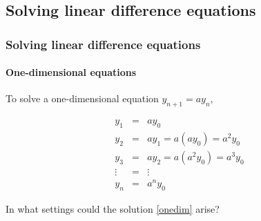 \documentclass[10pt, handout]{beamer}
\begin{document}
\subsection{Solving linear difference equations}
\begin{frame}
\frametitle{Solving linear difference equations}
\framesubtitle{One-dimensional equations}
To solve a one-dimensional equation $y_{n+1} = {a}y_{n}$,

\begin{eqnarray} \nonumber
y_1 &=& {a}y_0 \\ 
\nonumber
y_2 &=& {a}y_1 = a({a}y_0) = {a^2}y_0 \\ 
\nonumber
y_3 &=& {a}y_2 = a({a^2}y_0) = {a^3}y_0 \\ \nonumber
\vdots &=& \vdots \\ \label{onedim}
y_n &=& {a^n}y_0 
\end{eqnarray} \vskip0.1in

In what settings could the solution \eqref{onedim} arise?

\end{frame}
\end{document}
